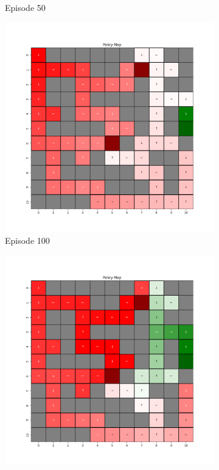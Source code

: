 \documentclass{assignment}
\begin{document}
\begin{figure}[H]
\begin{subfigure}{0.3\textwidth}
    \caption{Episode 50}
    \end{subfigure}\hfill
    \begin{subfigure}{0.3\textwidth}
        \includegraphics[width=\textwidth]{figures/policy_q/epsilon_sweep/policy_alpha_0.1_gamma_0.95_epsilon_0.8_iteration_100.png}
    \caption{Episode 100}
    \end{subfigure}
    \begin{subfigure}{0.3\textwidth}
        \includegraphics[width=\textwidth]{figures/policy_q/epsilon_sweep/policy_alpha_0.1_gamma_0.95_epsilon_0.8_iteration_1000.png}

\end{subfigure}
\end{figure}
\end{document}

